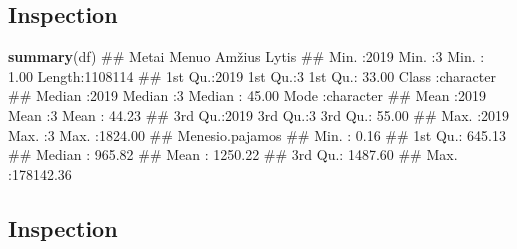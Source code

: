 \documentclass[]{article}
\newenvironment{Shaded}{\begin{snugshade}}{\end{snugshade}}
\newcommand{\KeywordTok}[1]{\textcolor[rgb]{0.13,0.29,0.53}{\textbf{#1}}}
\newcommand{\DataTypeTok}[1]{\textcolor[rgb]{0.13,0.29,0.53}{#1}}
\newcommand{\DecValTok}[1]{\textcolor[rgb]{0.00,0.00,0.81}{#1}}
\newcommand{\FloatTok}[1]{\textcolor[rgb]{0.00,0.00,0.81}{#1}}
\newcommand{\OperatorTok}[1]{\textcolor[rgb]{0.81,0.36,0.00}{\textbf{#1}}}
\newcommand{\NormalTok}[1]{#1}
\begin{document}
\subsection{Inspection}\label{inspection-2}

\begin{Shaded}
\begin{Highlighting}[]
\KeywordTok{summary}\NormalTok{(df)}
\NormalTok{##      Metai          Menuo       Amžius           Lytis          }
\NormalTok{##  Min.   :2019   Min.   :3   Min.   :   1.00   Length:1108114    }
\NormalTok{##  1st Qu.:2019   1st Qu.:3   1st Qu.:  33.00   Class :character  }
\NormalTok{##  Median :2019   Median :3   Median :  45.00   Mode  :character  }
\NormalTok{##  Mean   :2019   Mean   :3   Mean   :  44.23                     }
\NormalTok{##  3rd Qu.:2019   3rd Qu.:3   3rd Qu.:  55.00                     }
\NormalTok{##  Max.   :2019   Max.   :3   Max.   :1824.00                     }
\NormalTok{##  Menesio.pajamos    }
\NormalTok{##  Min.   :     0.16  }
\NormalTok{##  1st Qu.:   645.13  }
\NormalTok{##  Median :   965.82  }
\NormalTok{##  Mean   :  1250.22  }
\NormalTok{##  3rd Qu.:  1487.60  }
\NormalTok{##  Max.   :178142.36}
\end{Highlighting}
\end{Shaded}

\subsection{Inspection}\label{inspection-3}

\begin{Shaded}
\end{Shaded}
\end{document}
